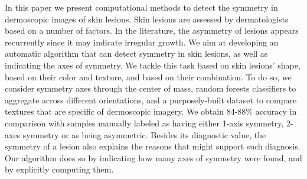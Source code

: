 
In this paper we present computational methods to detect the symmetry in dermoscopic images of skin lesions.
Skin lesions are assessed by dermatologists based on a number of factors.
In the literature, the asymmetry of lesions appears recurrently since it may indicate irregular growth.
We aim at developing an automatic algorithm that can detect symmetry in skin lesions, as well as indicating the axes of symmetry.
We tackle this task based on skin lesions' shape, based on their color and texture, and based on their combination.
To do so, we consider symmetry axes through the center of mass, random forests classifiers to aggregate across different orientations, and a purposely-built dataset to compare textures that are specific of dermoscopic imagery.
We obtain 84-88\% accuracy in comparison with samples manually labeled as having either 1-axis symmetry, 2-axes symmetry or as being asymmetric.
Besides its diagnostic value, the symmetry of a lesion also explains the reasons that might support such diagnosis.
Our algorithm does so by indicating how many axes of symmetry were found, and by explicitly computing them.


